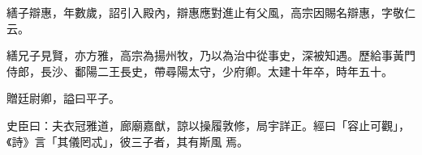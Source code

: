 \begin{pinyinscope}
 繕子辯惠，年數歲，詔引入殿內，辯惠應對進止有父風，高宗因賜名辯惠，字敬仁云。



 繕兄子見賢，亦方雅，高宗為揚州牧，乃以為治中從事史，深被知遇。歷給事黃門侍郎，長沙、鄱陽二王長史，帶尋陽太守，少府卿。太建十年卒，時年五十。



 贈廷尉卿，謚曰平子。



 史臣曰：夫衣冠雅道，廊廟嘉猷，諒以操履敦修，局宇詳正。經曰「容止可觀」，《詩》言「其儀罔忒」，彼三子者，其有斯風
 焉。



\end{pinyinscope}